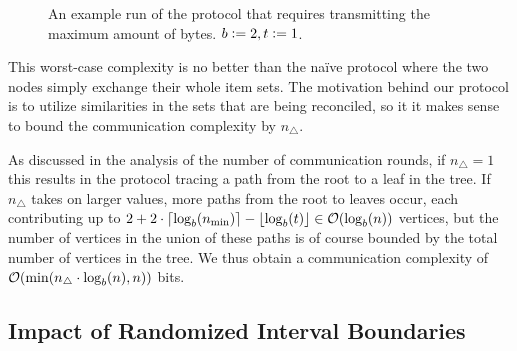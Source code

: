 \begin{figure*}
\begin{scaletikzpicturetowidth}{\textwidth}
\end{scaletikzpicturetowidth}

\caption{An example run of the protocol that requires transmitting the maximum amount of bytes. $b \vcentcolon= 2, t \vcentcolon= 1$.}

\label{fig:worst-bytes}
\end{figure*}

This worst-case complexity is no better than the naïve protocol where the two nodes simply exchange their whole item sets. The motivation behind our protocol is to utilize similarities in the sets that are being reconciled, so it it makes sense to bound the communication complexity by $n_{\triangle}$.

As discussed in the analysis of the number of communication rounds, if $n_{\triangle} = 1$ this results in the protocol tracing a path from the root to a leaf in the tree. If $n_{\triangle}$ takes on larger values, more paths from the root to leaves occur, each contributing up to $2 + 2 \cdot\lceil\log_{b}(n_{\min})\rceil - \lfloor\log_{b}(t)\rfloor \in \mathcal{O}(\log_{b}(n))$ vertices, but the number of vertices in the union of these paths is of course bounded by the total number of vertices in the tree. We thus obtain a communication complexity of $\mathcal{O}(\min(n_{\triangle} \cdot \log_b(n), n))$ bits.

\subsection{Impact of Randomized Interval Boundaries}
\label{random-boundaries}

